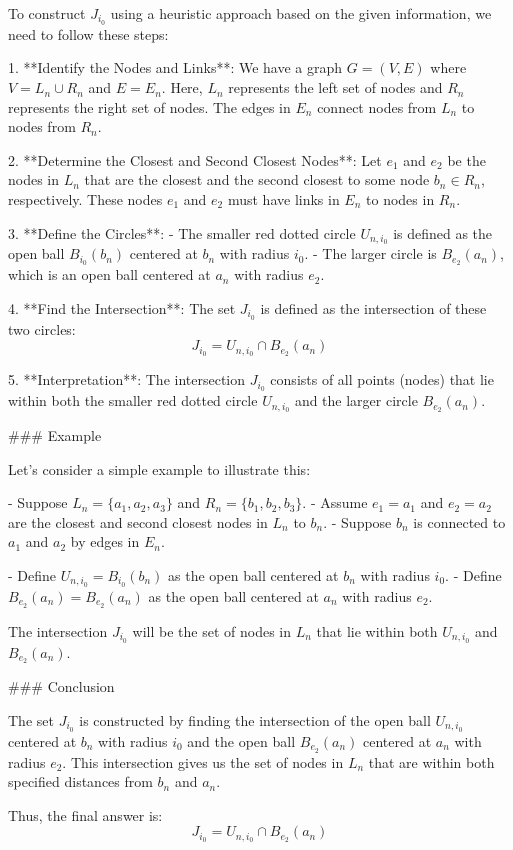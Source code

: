 To construct \( J_{i_0} \) using a heuristic approach based on the given information, we need to follow these steps:

1. **Identify the Nodes and Links**: We have a graph \( G = (V, E) \) where \( V = L_n \cup R_n \) and \( E = E_n \). Here, \( L_n \) represents the left set of nodes and \( R_n \) represents the right set of nodes. The edges in \( E_n \) connect nodes from \( L_n \) to nodes from \( R_n \).

2. **Determine the Closest and Second Closest Nodes**: Let \( e_1 \) and \( e_2 \) be the nodes in \( L_n \) that are the closest and the second closest to some node \( b_n \in R_n \), respectively. These nodes \( e_1 \) and \( e_2 \) must have links in \( E_n \) to nodes in \( R_n \).

3. **Define the Circles**: 
   - The smaller red dotted circle \( U_{n, i_0} \) is defined as the open ball \( B_{i_0}(b_n) \) centered at \( b_n \) with radius \( i_0 \).
   - The larger circle is \( B_{e_2}(a_n) \), which is an open ball centered at \( a_n \) with radius \( e_2 \).

4. **Find the Intersection**: The set \( J_{i_0} \) is defined as the intersection of these two circles:
   \[
   J_{i_0} = U_{n, i_0} \cap B_{e_2}(a_n)
   \]

5. **Interpretation**: The intersection \( J_{i_0} \) consists of all points (nodes) that lie within both the smaller red dotted circle \( U_{n, i_0} \) and the larger circle \( B_{e_2}(a_n) \).

### Example

Let's consider a simple example to illustrate this:

- Suppose \( L_n = \{a_1, a_2, a_3\} \) and \( R_n = \{b_1, b_2, b_3\} \).
- Assume \( e_1 = a_1 \) and \( e_2 = a_2 \) are the closest and second closest nodes in \( L_n \) to \( b_n \).
- Suppose \( b_n \) is connected to \( a_1 \) and \( a_2 \) by edges in \( E_n \).

- Define \( U_{n, i_0} = B_{i_0}(b_n) \) as the open ball centered at \( b_n \) with radius \( i_0 \).
- Define \( B_{e_2}(a_n) = B_{e_2}(a_n) \) as the open ball centered at \( a_n \) with radius \( e_2 \).

The intersection \( J_{i_0} \) will be the set of nodes in \( L_n \) that lie within both \( U_{n, i_0} \) and \( B_{e_2}(a_n) \).

### Conclusion

The set \( J_{i_0} \) is constructed by finding the intersection of the open ball \( U_{n, i_0} \) centered at \( b_n \) with radius \( i_0 \) and the open ball \( B_{e_2}(a_n) \) centered at \( a_n \) with radius \( e_2 \). This intersection gives us the set of nodes in \( L_n \) that are within both specified distances from \( b_n \) and \( a_n \).

Thus, the final answer is:
\[
\boxed{J_{i_0} = U_{n, i_0} \cap B_{e_2}(a_n)}
\]